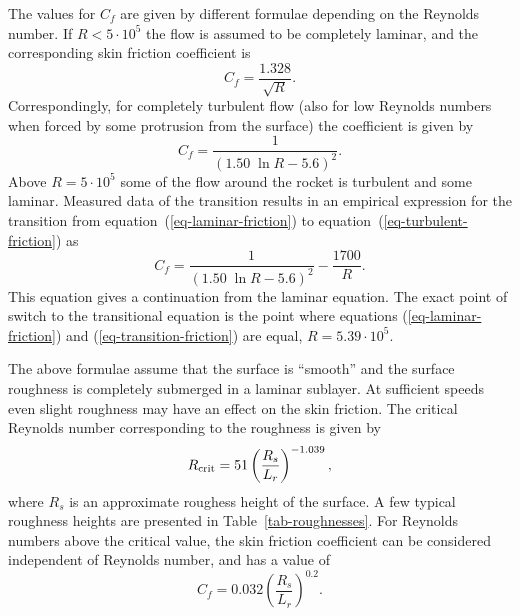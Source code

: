 The values for $C_f$ are given by different formulae depending on the
Reynolds number.  If $R<5\cdot10^5$ the flow is assumed to be
completely laminar, and the corresponding skin friction coefficient is
%
\begin{equation}
C_f = \frac{1.328}{\sqrt{R}}.
\label{eq-laminar-friction}
\end{equation}
%
Correspondingly, for completely turbulent flow (also for low Reynolds
numbers when forced by some protrusion from the surface) the
coefficient is given by
%
\begin{equation}
C_f = \frac{1}{(1.50\; \ln R - 5.6)^2}.
\label{eq-turbulent-friction}
\end{equation}
%
Above $R=5\cdot10^5$ some of the flow around the rocket is turbulent
and some laminar.  Measured data of the transition results in an
empirical expression for the transition from
equation~(\ref{eq-laminar-friction}) to
equation~(\ref{eq-turbulent-friction}) as
%
\begin{equation}
C_f = \frac{1}{(1.50\;\ln R - 5.6)^2} - \frac{1700}{R}.
\label{eq-transition-friction}
\end{equation}
%
This equation gives a continuation from the laminar equation.  The
exact point of switch to the transitional equation is the point where
equations (\ref{eq-laminar-friction}) and
(\ref{eq-transition-friction}) are equal, $R=5.39\cdot10^5$.



The above formulae assume that the surface is ``smooth'' and the
surface roughness is completely submerged in a laminar sublayer.  At
sufficient speeds even slight roughness may have an effect on the skin
friction.  The critical Reynolds number corresponding to the roughness
is given by
%
\begin{equation}
R_{\rm crit} = 51\left(\frac{R_s}{L_r}\right)^{-1.039},
\end{equation}
%
where $R_s$ is an approximate roughess height of the surface.  A few
typical roughness heights are presented in Table~\ref{tab-roughnesses}.
For Reynolds numbers above the critical value, the skin friction
coefficient can be considered independent of Reynolds number, and has
a value of
%
\begin{equation}
C_f = 0.032\left(\frac{R_s}{L_r}\right)^{0.2}.
\label{eq-critical-friction}
\end{equation}
%



